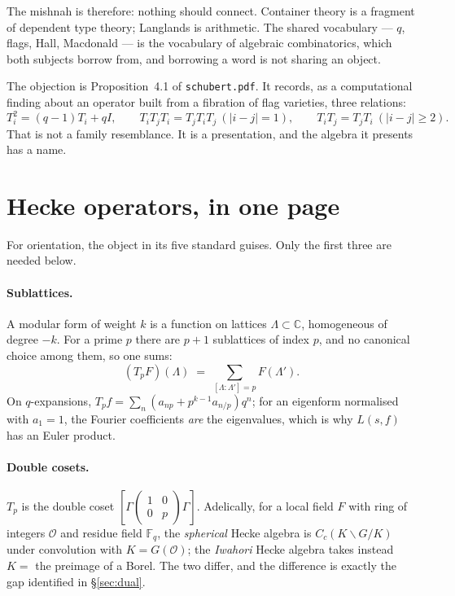 \documentclass[11pt,a4paper]{article}
\theoremstyle{definition}
\theoremstyle{remark}
\newcommand{\FF}{\mathbb{F}}
\newcommand{\CC}{\mathbb{C}}
\newcommand{\OO}{\mathcal{O}}
\begin{document}
The mishnah is therefore: nothing should connect. Container theory is a
fragment of dependent type theory; Langlands is arithmetic. The shared
vocabulary --- $q$, flags, Hall, Macdonald --- is the vocabulary of algebraic
combinatorics, which both subjects borrow from, and borrowing a word is not
sharing an object.

The objection is Proposition~4.1 of \texttt{schubert.pdf}. It records, as a
computational finding about an operator built from a fibration of flag
varieties, three relations:
\[
  T_i^2 = (q-1)T_i + qI,
  \qquad
  T_iT_jT_i = T_jT_iT_j \ (|i-j|=1),
  \qquad
  T_iT_j = T_jT_i \ (|i-j|\ge 2).
\]
That is not a family resemblance. It is a presentation, and the algebra it
presents has a name.

\section{Hecke operators, in one page}\label{sec:hecke}

For orientation, the object in its five standard guises. Only the first three
are needed below.

\paragraph{Sublattices.} A modular form of weight $k$ is a function on lattices
$\Lambda \subset \CC$, homogeneous of degree $-k$. For a prime $p$ there are
$p+1$ sublattices of index $p$, and no canonical choice among them, so one
sums:
\[
  (T_p F)(\Lambda) \;=\; \sum_{[\Lambda : \Lambda'] = p} F(\Lambda') .
\]
On $q$-expansions, $T_p f = \sum_n (a_{np} + p^{k-1}a_{n/p})q^n$; for an
eigenform normalised with $a_1 = 1$, the Fourier coefficients \emph{are} the
eigenvalues, which is why $L(s,f)$ has an Euler product.

\paragraph{Double cosets.} $T_p$ is the double coset
$[\Gamma \left(\begin{smallmatrix}1&0\\0&p\end{smallmatrix}\right)\Gamma]$.
Adelically, for a local field $F$ with ring of integers $\OO$ and residue field
$\FF_q$, the \emph{spherical} Hecke algebra is $C_c(K \backslash G / K)$ under
convolution with $K = G(\OO)$; the \emph{Iwahori} Hecke algebra takes instead
$K = $ the preimage of a Borel. The two differ, and the difference is exactly
the gap identified in \S\ref{sec:dual}.
\end{document}
